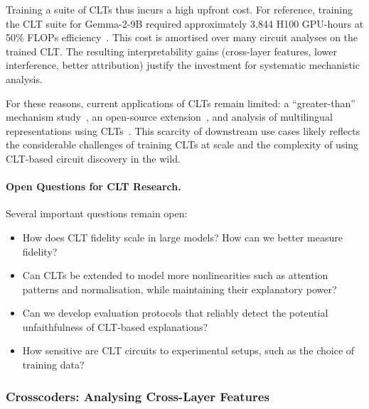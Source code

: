 Training a suite of CLTs thus incurs a high upfront cost. For reference, training the CLT suite for Gemma-2-9B
required approximately 3{,}844 H100 GPU-hours at 50\% FLOPs efficiency~. This cost is amortised over many circuit analyses on the trained CLT. The resulting interpretability gains (cross-layer features, lower interference, better attribution) justify the investment for systematic mechanistic analysis. 

For these reasons, current applications of CLTs remain limited: a ``greater-than'' mechanism
study~, an open-source
extension~, and analysis of multilingual representations using CLTs~. This scarcity of downstream use cases likely reflects the considerable challenges of training CLTs at scale and the complexity of using CLT-based circuit discovery in the wild.

\paragraph{Open Questions for CLT Research.}
Several important questions remain open:
\begin{itemize}
    \item How does CLT fidelity scale in large models? How can we better measure fidelity?
    \item Can CLTs be extended to model more nonlinearities such as attention patterns and normalisation, while maintaining their explanatory power?
    \item Can we develop evaluation protocols that reliably detect the potential unfaithfulness of CLT-based explanations?
    \item How sensitive are CLT circuits to experimental setups, such as the choice of training data?
\end{itemize}

\subsubsection{Crosscoders: Analysing Cross-Layer Features}

